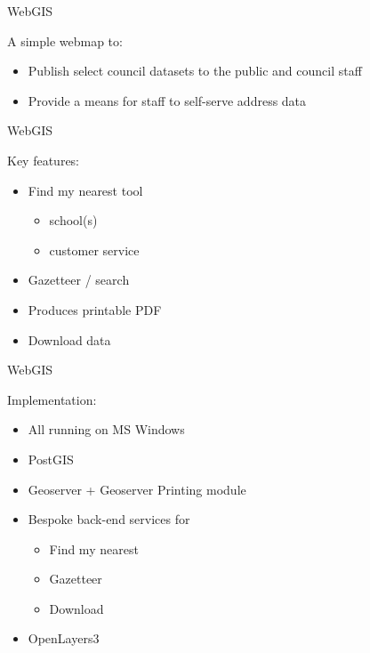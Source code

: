 \begin{frame}{WebGIS}
	\begin{block}{A simple webmap to:}
		\begin{itemize}
			\item Publish select council datasets to the public and council staff
			\item Provide a means for staff to self-serve address data 
		\end{itemize}
	\end{block}	
\end{frame}


\begin{frame}{WebGIS}
	\begin{block}{Key features:}
		\begin{itemize}
			\item Find my nearest tool
			\begin{itemize}
				\item school(s)
				\item customer service
			\end{itemize}	
			\item Gazetteer / search
			\item Produces printable PDF
			\item Download data
		\end{itemize}
	\end{block}	
\end{frame}

\begin{frame}{WebGIS}
	\begin{block}{Implementation:}
		\begin{itemize}
			\item All running on MS Windows
			\item PostGIS
			\item Geoserver + Geoserver Printing module
			\item Bespoke back-end services for
					\begin{itemize}
						\item Find my nearest
						\item Gazetteer
						\item Download
					\end{itemize}
			\item OpenLayers3
		\end{itemize}
	\end{block}	
\end{frame}


